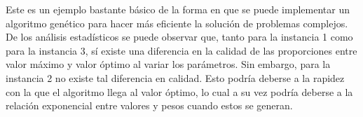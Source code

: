 \documentclass{article}
\begin{document}
Este es un ejemplo bastante b\'asico de la forma en que se puede implementar un algoritmo gen\'etico para hacer m\'as eficiente la soluci\'on de problemas complejos.\\

De los an\'alisis estad\'isticos se puede observar que, tanto para la instancia 1 como para la instancia 3, s\'i existe una diferencia en la calidad de las proporciones entre valor m\'aximo y valor \'optimo al variar los par\'ametros. Sin embargo, para la instancia 2 no existe tal diferencia en calidad. Esto podr\'ia deberse a la rapidez con la que el algoritmo llega al valor \'optimo, lo cual a su vez podr\'ia deberse a la relaci\'on exponencial entre valores y pesos cuando estos se generan.



\end{document}
